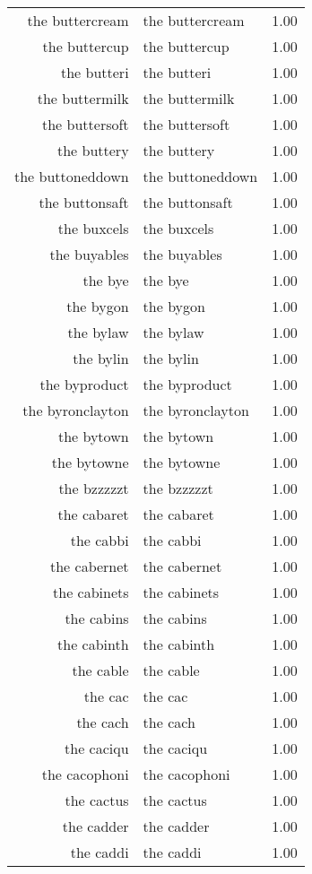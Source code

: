 \begin{table}[ht]
\begin{tabular}{rlr}
  the buttercream & the buttercream & 1.00 \\ 
  the buttercup & the buttercup & 1.00 \\ 
  the butteri & the butteri & 1.00 \\ 
  the buttermilk & the buttermilk & 1.00 \\ 
  the buttersoft & the buttersoft & 1.00 \\ 
  the buttery & the buttery & 1.00 \\ 
  the buttoneddown & the buttoneddown & 1.00 \\ 
  the buttonsaft & the buttonsaft & 1.00 \\ 
  the buxcels & the buxcels & 1.00 \\ 
  the buyables & the buyables & 1.00 \\ 
  the bye & the bye & 1.00 \\ 
  the bygon & the bygon & 1.00 \\ 
  the bylaw & the bylaw & 1.00 \\ 
  the bylin & the bylin & 1.00 \\ 
  the byproduct & the byproduct & 1.00 \\ 
  the byronclayton & the byronclayton & 1.00 \\ 
  the bytown & the bytown & 1.00 \\ 
  the bytowne & the bytowne & 1.00 \\ 
  the bzzzzzt & the bzzzzzt & 1.00 \\ 
  the cabaret & the cabaret & 1.00 \\ 
  the cabbi & the cabbi & 1.00 \\ 
  the cabernet & the cabernet & 1.00 \\ 
  the cabinets & the cabinets & 1.00 \\ 
  the cabins & the cabins & 1.00 \\ 
  the cabinth & the cabinth & 1.00 \\ 
  the cable & the cable & 1.00 \\ 
  the cac & the cac & 1.00 \\ 
  the cach & the cach & 1.00 \\ 
  the caciqu & the caciqu & 1.00 \\ 
  the cacophoni & the cacophoni & 1.00 \\ 
  the cactus & the cactus & 1.00 \\ 
  the cadder & the cadder & 1.00 \\ 
  the caddi & the caddi & 1.00 \\ 

\end{tabular}
\end{table}
